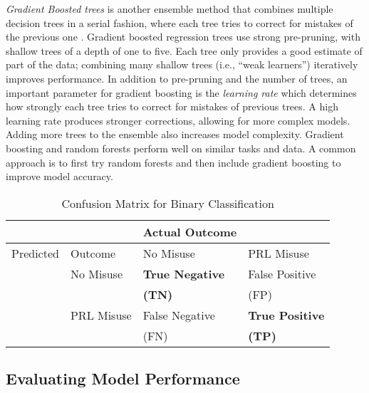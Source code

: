 \documentclass[sigconf]{acmart}
\begin{document}

\emph{Gradient Boosted trees} is another ensemble method that combines 
multiple decision trees in a serial fashion, where each tree tries to correct 
for mistakes of the previous one \cite{muller17}. Gradient boosted regression 
trees use strong pre-pruning, with shallow trees of a depth of one to five. 
Each tree only provides a good estimate of part of the data; combining many 
shallow trees (i.e., ``weak learners'') iteratively improves performance. 
In addition to pre-pruning and the number of trees, an important parameter 
for gradient boosting is the \emph{learning rate} which determines how 
strongly each tree tries to correct for mistakes of previous trees. A high 
learning rate produces stronger corrections, allowing for more complex models. 
Adding more trees to the ensemble also increases model complexity. Gradient 
boosting and random forests perform well on similar tasks and data. A common 
approach is to first try random forests and then include gradient boosting 
to improve model accuracy. 


\begin{table}
  \caption{Confusion Matrix for Binary Classification}
  \label{tab:freq}
  \begin{tabular}{llll}
    \toprule
     & &  Actual Outcome & \\
    \midrule
    Predicted & Outcome & No Misuse & PRL Misuse \\
    \midrule
    & No Misuse & \textbf{True Negative} & False Positive \\
    & & \textbf{(TN)} & (FP) \\
    \midrule
    & PRL Misuse & False Negative & \textbf{True Positive} \\
    & & (FN) & \textbf{(TP)}  \\
    \bottomrule
  \end{tabular}
\end{table}


\subsection{Evaluating Model Performance}
\end{document}
